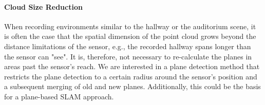 \documentclass[main.tex]{subfiles}
\begin{document}
\paragraph{Cloud Size Reduction}
When recording environments similar to the hallway or the auditorium scene, it is often the case that the spatial dimension of the point cloud grows beyond the distance limitations of the sensor, e.g., the recorded hallway spans longer than the sensor can "see". It is, therefore, not necessary to re-calculate the planes in areas past the sensor's reach. We are interested in a plane detection method that restricts the plane detection to a certain radius around the sensor's position and a subsequent merging of old and new planes. Additionally, this could be the basis for a plane-based SLAM approach.

\end{document}
